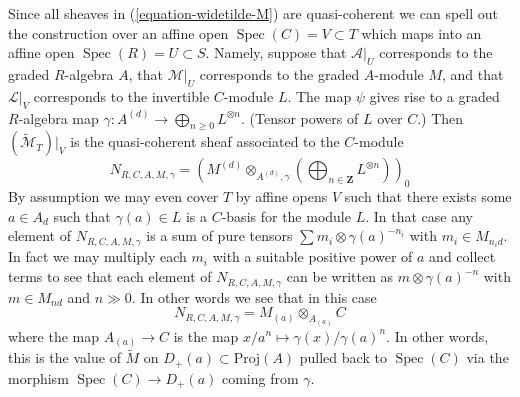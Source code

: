 \documentclass{stacks-project}
\theoremstyle{plain}
\theoremstyle{definition}
\theoremstyle{remark}
\numberwithin{equation}{subsection}
\def\Spec{\mathop{\mathrm{Spec}}}
\begin{document}
\medskip\noindent
Since all sheaves in (\ref{equation-widetilde-M}) are quasi-coherent
we can spell out the construction
over an affine open $\Spec(C) = V \subset T$
which maps into an affine open $\Spec(R) = U \subset S$.
Namely, suppose that $\mathcal{A}|_U$ corresponds
to the graded $R$-algebra $A$, that $\mathcal{M}|_U$ corresponds to the
graded $A$-module $M$, and that $\mathcal{L}|_V$ corresponds to the
invertible $C$-module $L$. The map $\psi$ gives
rise to a graded $R$-algebra map
$\gamma : A^{(d)} \to \bigoplus_{n \geq 0} L^{\otimes n}$.
(Tensor powers of $L$ over $C$.)
Then $(\widetilde{\mathcal{M}}_T)|_V$
is the quasi-coherent sheaf associated to the $C$-module
$$
N_{R, C, A, M, \gamma} =
\left(
M^{(d)} \otimes_{A^{(d)}, \gamma}
\left(\bigoplus\nolimits_{n \in \mathbf{Z}} L^{\otimes n}\right)
\right)_0
$$
By assumption we may even cover $T$ by affine opens
$V$ such that there exists some $a \in A_d$ such that
$\gamma(a) \in L$ is a $C$-basis for the module $L$.
In that case any element of $N_{R, C, A, M, \gamma}$ is a sum
of pure tensors $\sum m_i \otimes \gamma(a)^{-n_i}$ with $m_i \in M_{n_id}$.
In fact we may multiply each $m_i$ with a suitable positive power
of $a$ and collect terms to see that each element of $N_{R, C, A, M, \gamma}$
can be written as $m \otimes \gamma(a)^{-n}$ with $m \in M_{nd}$ and
$n \gg 0$. In other words we see that in this case
$$
N_{R, C, A, M, \gamma} = M_{(a)} \otimes_{A_{(a)}} C
$$
where the map $A_{(a)} \to C$ is the map
$x/a^n \mapsto \gamma(x)/\gamma(a)^n$. In other words, this is
the value of $\widetilde{M}$ on $D_{+}(a) \subset \text{Proj}(A)$
pulled back to $\Spec(C)$ via the morphism
$\Spec(C) \to D_{+}(a)$ coming from $\gamma$.
\end{document}
